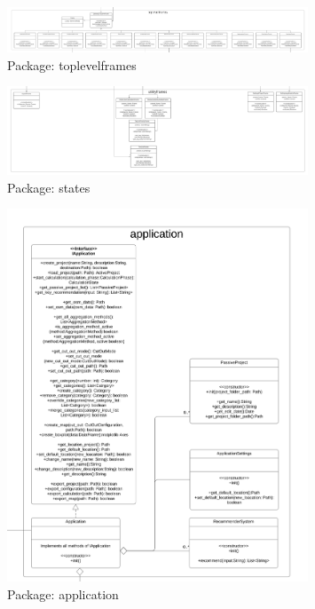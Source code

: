 \documentclass[letterpaper,10pt,english]{sphinxmanual}
\begin{document}
\hypertarget{toplevelframes}{
\begin{figure}[hbt!]
  \centering
\includegraphics[width=0.8\textwidth]
        {pictures/toplevelframes.png}
  \caption{Package: toplevelframes}
  \label{fig:mvc}
\end{figure}
}

\hypertarget{utilityframes}{
\begin{figure}[hbt!]
  \centering
\includegraphics[width=0.8\textwidth]
        {pictures/utilityframes.png}
  \caption{Package: states}
  \label{fig:mvc}
\end{figure}
}

\hypertarget{application}{
\begin{figure}[hbt!]
  \centering
\includegraphics[width=0.8\textwidth]
        {pictures/application.png}
  \caption{Package: application}
  \label{fig:mvc}
\end{figure}
}
\end{document}

